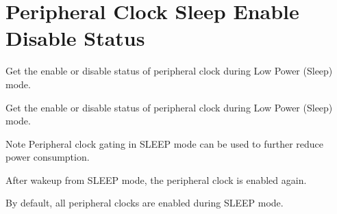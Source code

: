 \hypertarget{group___r_c_c_ex___peripheral___clock___sleep___enable___disable___status}{\section{Peripheral Clock Sleep Enable Disable Status}
\label{group___r_c_c_ex___peripheral___clock___sleep___enable___disable___status}
}


Get the enable or disable status of peripheral clock during Low Power (Sleep) mode.  


Get the enable or disable status of peripheral clock during Low Power (Sleep) mode. \begin{DoxyNote}{Note}
Peripheral clock gating in S\-L\-E\-E\-P mode can be used to further reduce power consumption. 

After wakeup from S\-L\-E\-E\-P mode, the peripheral clock is enabled again. 

By default, all peripheral clocks are enabled during S\-L\-E\-E\-P mode. 
\end{DoxyNote}
